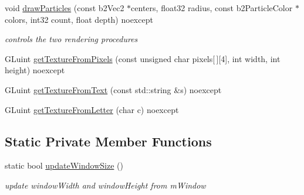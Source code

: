 \begin{DoxyCompactItemize}
void \hyperlink{classRender_af614fa8f3a307eea0782bddae4cc5bac}{draw\+Particles} (const b2\+Vec2 $\ast$centers, float32 radius, const b2\+Particle\+Color $\ast$colors, int32 count, float depth) noexcept
\begin{DoxyCompactList}\small\item\em controls the two rendering procedures \end{DoxyCompactList}\item 
G\+Luint \hyperlink{classRender_ae568b0266e416803d961cc66bb57dbf9}{get\+Texture\+From\+Pixels} (const unsigned char pixels\mbox{[}$\,$\mbox{]}\mbox{[}4\mbox{]}, int width, int height) noexcept
\item 
G\+Luint \hyperlink{classRender_adf10a27af849b5b372e99dc2eb3aecf5}{get\+Texture\+From\+Text} (const std\+::string \&s) noexcept
\item 
G\+Luint \hyperlink{classRender_a5a22d68ea1a2a93c90b35ddca7ac4210}{get\+Texture\+From\+Letter} (char c) noexcept
\end{DoxyCompactItemize}
\subsection*{Static Private Member Functions}
\begin{DoxyCompactItemize}
\item 
static bool \hyperlink{classRender_ad82e10fc7cf64fc9a60c853c0e5320dd}{update\+Window\+Size} ()
\begin{DoxyCompactList}\small\item\em update window\+Width and window\+Height from m\+Window \end{DoxyCompactList}\end{DoxyCompactItemize}
